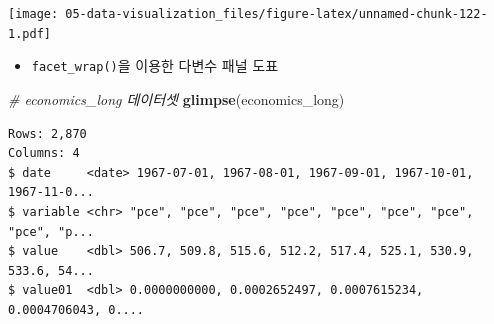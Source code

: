\documentclass[
  11pt,
]{krantz}
\newenvironment{Shaded}{\begin{snugshade}}{\end{snugshade}}
\newcommand{\CommentTok}[1]{\textcolor[rgb]{0.37,0.37,0.37}{\textit{#1}}}
\newcommand{\DataTypeTok}[1]{\textcolor[rgb]{0.27,0.27,0.27}{#1}}
\newcommand{\DecValTok}[1]{\textcolor[rgb]{0.06,0.06,0.06}{#1}}
\newcommand{\KeywordTok}[1]{\textcolor[rgb]{0.27,0.27,0.27}{\textbf{#1}}}
\newcommand{\NormalTok}[1]{#1}
\newcommand{\OperatorTok}[1]{\textcolor[rgb]{0.43,0.43,0.43}{\textbf{#1}}}
\newcommand{\StringTok}[1]{\textcolor[rgb]{0.5,0.5,0.5}{#1}}
\providecommand{\tightlist}{%
  \setlength{\itemsep}{0pt}\setlength{\parskip}{0pt}}
\begin{document}
\texttt{[image: 05-data-visualization\_files/figure-latex/unnamed-chunk-122-1.pdf]}

\normalsize

\begin{itemize}
\tightlist
\item
  \texttt{facet\_wrap()}을 이용한 다변수 패널 도표
\end{itemize}

\footnotesize

\begin{Shaded}
\begin{Highlighting}[]
\CommentTok{# economics_long 데이터셋}
\KeywordTok{glimpse}\NormalTok{(economics_long)}
\end{Highlighting}
\end{Shaded}

\begin{verbatim}
Rows: 2,870
Columns: 4
$ date     <date> 1967-07-01, 1967-08-01, 1967-09-01, 1967-10-01, 1967-11-0...
$ variable <chr> "pce", "pce", "pce", "pce", "pce", "pce", "pce", "pce", "p...
$ value    <dbl> 506.7, 509.8, 515.6, 512.2, 517.4, 525.1, 530.9, 533.6, 54...
$ value01  <dbl> 0.0000000000, 0.0002652497, 0.0007615234, 0.0004706043, 0....
\end{verbatim}

\begin{Shaded}
\end{Shaded}
\end{document}
